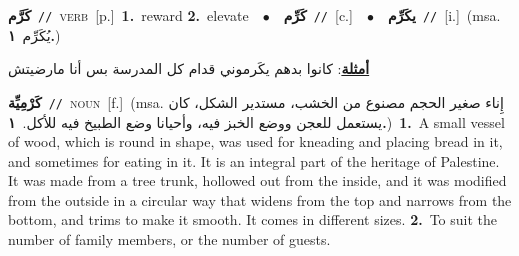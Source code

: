 \documentclass[10pt,a4paper,twoside]{article} %
\begin{document}
\begin{multicols}{2}
{\setlength\topsep{0pt}\textbf{\foreignlanguage{arabic}{كَرَّم}}\ {\color{gray}\texttt{//}\color{black}}\ \textsc{verb}\ [p.]\ \textbf{1.}~reward  \textbf{2.}~elevate\ \ $\bullet$\ \ \setlength\topsep{0pt}\textbf{\foreignlanguage{arabic}{كَرِّم}}\ {\color{gray}\texttt{//}\color{black}}\ [c.]\ \ $\bullet$\ \ \setlength\topsep{0pt}\textbf{\foreignlanguage{arabic}{يكَرِّم}}\ {\color{gray}\texttt{//}\color{black}}\ [i.]\ \color{gray}(msa. \foreignlanguage{arabic}{يُكَرِّم}~\foreignlanguage{arabic}{\textbf{١.}})\color{black}\  \begin{flushright}\color{gray}\foreignlanguage{arabic}{\textbf{\underline{\foreignlanguage{arabic}{أمثلة}}}: كانوا بدهم يكَرموني قدام كل المدرسة بس أنا مارضيتش}\end{flushright}\color{black}} \vspace{2mm}

{\setlength\topsep{0pt}\textbf{\foreignlanguage{arabic}{كَرْمِيِّة}}\ {\color{gray}\texttt{//}\color{black}}\ \textsc{noun}\ [f.]\ \color{gray}(msa. \foreignlanguage{arabic}{إِناء صغير الحجم مصنوع من الخشب، مستدير الشكل، كان يستعمل للعجن ووضع الخبز فيه، وأحيانا وضع الطبيخ فيه للأكل.}~\foreignlanguage{arabic}{\textbf{١.}})\color{black}\ \textbf{1.}~A small vessel of wood, which is round in shape, was used for kneading and placing bread in it, and sometimes for eating in it. It is an integral part of the heritage of Palestine. It was made from a tree trunk, hollowed out from the inside, and it was modified from the outside in a circular way that widens from the top and narrows from the bottom, and trims to make it smooth. It comes in different sizes.  \textbf{2.}~To suit the number of family members, or the number of guests.\ } \vspace{2mm}


\end{multicols}
\end{document}
